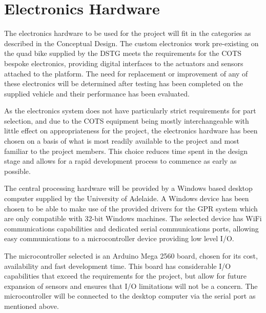 \documentclass[main.tex]{subfiles}
\begin{document}
\section{Electronics Hardware}
The electronics hardware to be used for the project will fit in the categories as described in the Conceptual Design. The custom electronics work pre-existing on the quad bike supplied by the DSTG meets the requirements for the COTS bespoke electronics, providing digital interfaces to the actuators and sensors attached to the platform. The need for replacement or improvement of any of these electronics will be determined after testing has been completed on the supplied vehicle and their performance has been evaluated.

As the electronics system does not have particularly strict requirements for part selection, and due to the COTS equipment being mostly interchangeable with little effect on appropriateness for the project, the electronics hardware has been chosen on a basis of what is most readily available to the project and most familiar to the project members. This choice reduces time spent in the design stage and allows for a rapid development process to commence as early as possible.

The central processing hardware will be provided by a Windows based desktop computer supplied by the University of Adelaide. A Windows device has been chosen to be able to make use of the provided drivers for the GPR system which are only compatible with 32-bit Windows machines. The selected device has WiFi communications capabilities and dedicated serial communications ports, allowing easy communications to a microcontroller device providing low level I/O.

The microcontroller selected is an Arduino Mega 2560 board, chosen for its cost, availability and fast development time. This board has considerable I/O capabilities that exceed the requirements for the project, but allow for future expansion of sensors and ensures that I/O limitations will not be a concern. The microcontroller will be connected to the desktop computer via the serial port as mentioned above.
\end{document}
